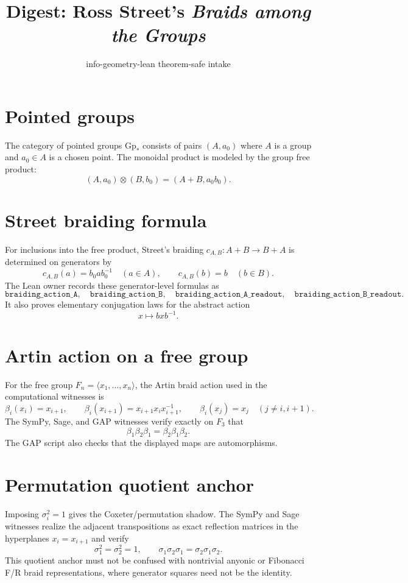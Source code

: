 \documentclass{article}
\title{Digest: Ross Street's \emph{Braids among the Groups}}
\author{info-geometry-lean theorem-safe intake}
\date{}
\begin{document}
\maketitle

\section{Pointed groups}
The category of pointed groups $\mathrm{Gp}_*$ consists of pairs $(A,a_0)$
where $A$ is a group and $a_0\in A$ is a chosen point.  The monoidal product is
modeled by the group free product:
\[
  (A,a_0)\otimes(B,b_0)=(A+B,a_0b_0).
\]

\section{Street braiding formula}
For inclusions into the free product, Street's braiding
$c_{A,B}:A+B\to B+A$ is determined on generators by
\[
  c_{A,B}(a)=b_0 a b_0^{-1}\quad(a\in A),
  \qquad
  c_{A,B}(b)=b\quad(b\in B).
\]
The Lean owner records these generator-level formulas as
\[
\texttt{braiding\_action\_A},\quad
\texttt{braiding\_action\_B},\quad
\texttt{braiding\_action\_A\_readout},\quad
\texttt{braiding\_action\_B\_readout}.
\]
It also proves elementary conjugation laws for the abstract action
\[
  x\mapsto bxb^{-1}.
\]

\section{Artin action on a free group}
For the free group $F_n=\langle x_1,\ldots,x_n\rangle$, the Artin braid action
used in the computational witnesses is
\[
\beta_i(x_i)=x_{i+1},\qquad
\beta_i(x_{i+1})=x_{i+1}x_i x_{i+1}^{-1},\qquad
\beta_i(x_j)=x_j\quad(j\ne i,i+1).
\]
The SymPy, Sage, and GAP witnesses verify exactly on $F_3$ that
\[
  \beta_1\beta_2\beta_1=\beta_2\beta_1\beta_2.
\]
The GAP script also checks that the displayed maps are automorphisms.

\section{Permutation quotient anchor}
Imposing $\sigma_i^2=1$ gives the Coxeter/permutation shadow.  The SymPy and
Sage witnesses realize the adjacent transpositions as exact reflection matrices
in the hyperplanes $x_i=x_{i+1}$ and verify
\[
  \sigma_1^2=\sigma_2^2=1,
  \qquad
  \sigma_1\sigma_2\sigma_1=\sigma_2\sigma_1\sigma_2.
\]
This quotient anchor must not be confused with nontrivial anyonic or Fibonacci
F/R braid representations, where generator squares need not be the identity.
\end{document}
